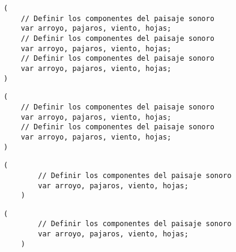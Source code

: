 \begin{minipage}[t]{.48\textwidth}
    \begin{lstlisting}[style=SuperCollider-IDE, basicstyle=\footnotesize\ttfamily, numbers=none]
(
    // Definir los componentes del paisaje sonoro
    var arroyo, pajaros, viento, hojas;
    // Definir los componentes del paisaje sonoro
    var arroyo, pajaros, viento, hojas;
    // Definir los componentes del paisaje sonoro
    var arroyo, pajaros, viento, hojas;
)          
    \end{lstlisting}
\end{minipage}\hfill
\begin{minipage}[t]{.48\textwidth}
    \begin{lstlisting}[style=SuperCollider-IDE, basicstyle=\footnotesize\ttfamily, numbers=none]
(
    // Definir los componentes del paisaje sonoro
    var arroyo, pajaros, viento, hojas;
    // Definir los componentes del paisaje sonoro
    var arroyo, pajaros, viento, hojas;
)          
    \end{lstlisting}
\end{minipage}

\vspace{20pt} %

\begin{minipage}[t]{.48\textwidth}
    \begin{lstlisting}[style=SuperCollider-IDE, basicstyle=\footnotesize\ttfamily, numbers=none]
    (
        // Definir los componentes del paisaje sonoro
        var arroyo, pajaros, viento, hojas;
    )          
    \end{lstlisting}
\end{minipage}\hfill
\begin{minipage}[t]{.48\textwidth}
    \begin{lstlisting}[style=SuperCollider-IDE, basicstyle=\footnotesize\ttfamily, numbers=none]
    (
        // Definir los componentes del paisaje sonoro
        var arroyo, pajaros, viento, hojas;
    )          
    \end{lstlisting}
\end{minipage}
  